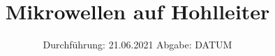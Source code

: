 



\subject{V53}  %
\title{Mikrowellen auf Hohlleiter} %
\date{%
  Durchführung: 21.06.2021
  \hspace{3em}
  Abgabe: DATUM
}



\maketitle
\thispagestyle{empty}
\tableofcontents
\newpage







\printbibliography{}


